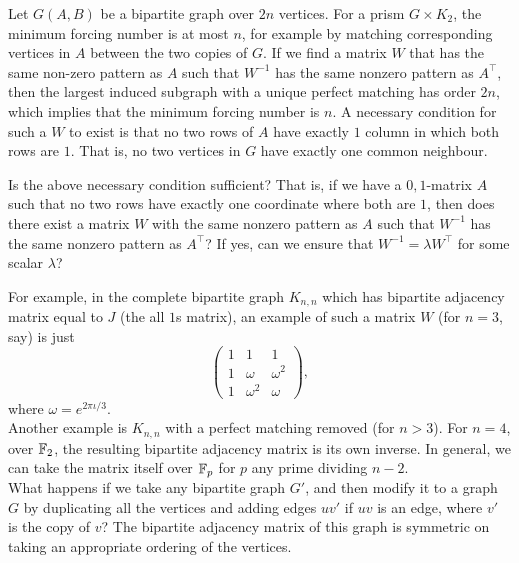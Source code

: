 	Let $G(A,B)$ be a bipartite graph over $2n$ vertices. For a prism $G \times K_2$, the minimum forcing number is at most $n$, for example by matching corresponding vertices in $A$ between the two copies of $G$. If we find a matrix $W$ that has the same non-zero pattern as $A$ such that $W^{-1}$ has the same nonzero pattern as $A^\top$, then the largest induced subgraph with a unique perfect matching has order $2n$, which implies that the minimum forcing number is $n$. A necessary condition for such a $W$ to exist is that no two rows of $A$ have exactly $1$ column in which both rows are $1$. That is, no two vertices in $G$ have exactly one common neighbour.

	\begin{question}
		Is the above necessary condition sufficient? That is, if we have a $0,1$-matrix $A$ such that no two rows have exactly one coordinate where both are $1$, then does there exist a matrix $W$ with the same nonzero pattern as $A$ such that $W^{-1}$ has the same nonzero pattern as $A^\top$? If yes, can we ensure that $W^{-1} = \lambda W^\top$ for some scalar $\lambda$?
	\end{question}

	For example, in the complete bipartite graph $K_{n,n}$ which has bipartite adjacency matrix equal to $J$ (the all $1$s matrix), an example of such a matrix $W$ (for $n=3$, say) is just
	\[
	\begin{pmatrix}
		1 & 1 & 1 \\ 1 & \omega & \omega^2 \\ 1 & \omega^2 & \omega
	\end{pmatrix},
	\]
	where $\omega = e^{2\pi\iota/3}$.\\
	Another example is $K_{n,n}$ with a perfect matching removed (for $n > 3$). For $n=4$, over $\mathbb{F}_2$, the resulting bipartite adjacency matrix is its own inverse. In general, we can take the matrix itself over $\mathbb{F}_p$ for $p$ any prime dividing $n-2$.\\
	
	What happens if we take any bipartite graph $G'$, and then modify it to a graph $G$ by duplicating all the vertices and adding edges $uv'$ if $uv$ is an edge, where $v'$ is the copy of $v$? The bipartite adjacency matrix of this graph is symmetric on taking an appropriate ordering of the vertices. \\

